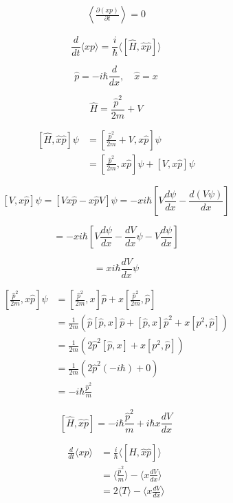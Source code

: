 \documentclass[12pt]{article}
\begin{document}
\begin{equation*}
    \begin{split}
        \left\langle \frac{\partial (x p)}{\partial t} \right\rangle = 0
    \end{split}
\end{equation*}

\[
    \frac{d}{dt} \langle x p \rangle
    = \frac{i}{\hbar} \langle [\hat{H}, \hat{x}\hat{p}] \rangle
\]

\[
    \hat{p} = -i\hbar \frac{d}{dx}, \quad \hat{x} = x
\]

\[
    \hat{H} = \frac{\hat{p}^2}{2m} + V
\]

\begin{equation*}
    \begin{split}
        [\hat{H}, \hat{x}\hat{p}] \psi
         & =  [\frac{\hat{p}^2}{2m} + V, x\hat{p}] \psi                 \\
         & =  [\frac{\hat{p}^2}{2m}, x\hat{p}] \psi + [V, x\hat{p}]\psi
    \end{split}
\end{equation*}

\[
    [V, x\hat{p}]\psi
    = [Vx\hat{p} - x\hat{p}V]\psi
    = -xi\hbar[V \frac{d \psi}{dx} - \frac{d (V\psi)}{dx}]
\]

\[
    = -xi\hbar[V \frac{d \psi}{dx} - \frac{dV}{dx}\psi - V\frac{d \psi}{dx}]
\]

\[
    = xi\hbar\frac{dV}{dx}\psi
\]

\begin{equation*}
    \begin{split}
        [\frac{\hat{p}^2}{2m}, x\hat{p}] \psi
         & = [\frac{\hat{p}^2}{2m}, x]\hat{p} + x[\frac{\hat{p}^2}{2m},\hat{p}]                  \\
         & = \frac{1}{2m}(\hat{p}[\hat{p}, x]\hat{p} + [\hat{p}, x] \hat{p}^2+ x[{p}^2,\hat{p}]) \\
         & =\frac{1}{2m}(2\hat{p}^2[\hat{p}, x]+ x[{p}^2,\hat{p}])                               \\
         & = \frac{1}{2m}(2\hat{p}^2(-i\hbar)+ 0)                                                \\
         & = -i\hbar\frac{\hat{p}^2}{m}
    \end{split}
\end{equation*}

\[
    [\hat{H}, \hat{x}\hat{p}] = -i\hbar\frac{\hat{p}^2}{m} + i\hbar x\frac{dV}{dx}
\]

\begin{equation*}
    \begin{split}
        \frac{d}{dt} \langle x p \rangle
         & = \frac{i}{\hbar} \langle [\hat{H}, \hat{x}\hat{p}] \rangle            \\
         & = \langle \frac{\hat{p}^2}{m} \rangle - \langle x\frac{dV}{dx} \rangle \\
         & = 2 \langle T \rangle - \langle x\frac{dV}{dx} \rangle
    \end{split}
\end{equation*}
\end{document}
